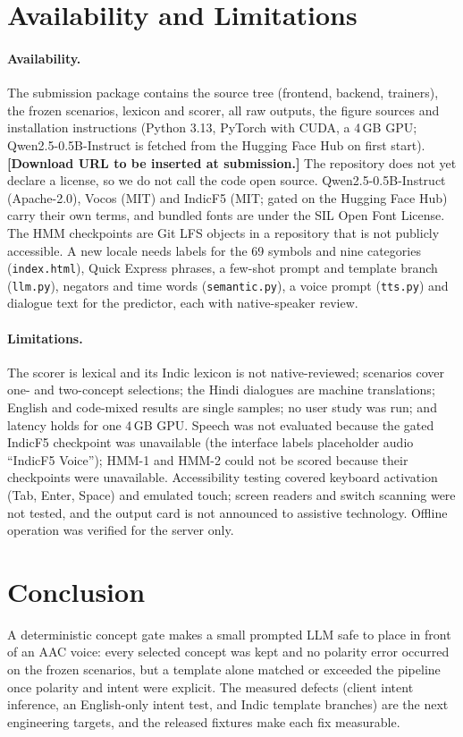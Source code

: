 \section{Availability and Limitations}
\label{sec:limits}

\paragraph{Availability.}
The submission package contains the source tree (frontend, backend, trainers), the frozen scenarios, lexicon and scorer, all raw outputs, the figure sources and installation instructions (Python 3.13, PyTorch with CUDA, a 4\,GB GPU; Qwen2.5-0.5B-Instruct is fetched from the Hugging Face Hub on first start). \textbf{[Download URL to be inserted at submission.]}
The repository does not yet declare a license, so we do not call the code open source.
Qwen2.5-0.5B-Instruct (Apache-2.0), Vocos (MIT) and IndicF5 (MIT; gated on the Hugging Face Hub) carry their own terms, and bundled fonts are under the SIL Open Font License.
The HMM checkpoints are Git LFS objects in a repository that is not publicly accessible.
A new locale needs labels for the 69 symbols and nine categories (\texttt{index.html}), Quick Express phrases, a few-shot prompt and template branch (\texttt{llm.py}), negators and time words (\texttt{semantic.py}), a voice prompt (\texttt{tts.py}) and dialogue text for the predictor, each with native-speaker review.

\paragraph{Limitations.}
The scorer is lexical and its Indic lexicon is not native-reviewed; scenarios cover one- and two-concept selections; the Hindi dialogues are machine translations; English and code-mixed results are single samples; no user study was run; and latency holds for one 4\,GB GPU.
Speech was not evaluated because the gated IndicF5 checkpoint was unavailable (the interface labels placeholder audio ``IndicF5 Voice''); HMM-1 and HMM-2 could not be scored because their checkpoints were unavailable.
Accessibility testing covered keyboard activation (Tab, Enter, Space) and emulated touch; screen readers and switch scanning were not tested, and the output card is not announced to assistive technology.
Offline operation was verified for the server only.

\section{Conclusion}
A deterministic concept gate makes a small prompted LLM safe to place in front of an AAC voice: every selected concept was kept and no polarity error occurred on the frozen scenarios, but a template alone matched or exceeded the pipeline once polarity and intent were explicit.
The measured defects (client intent inference, an English-only intent test, and Indic template branches) are the next engineering targets, and the released fixtures make each fix measurable.
